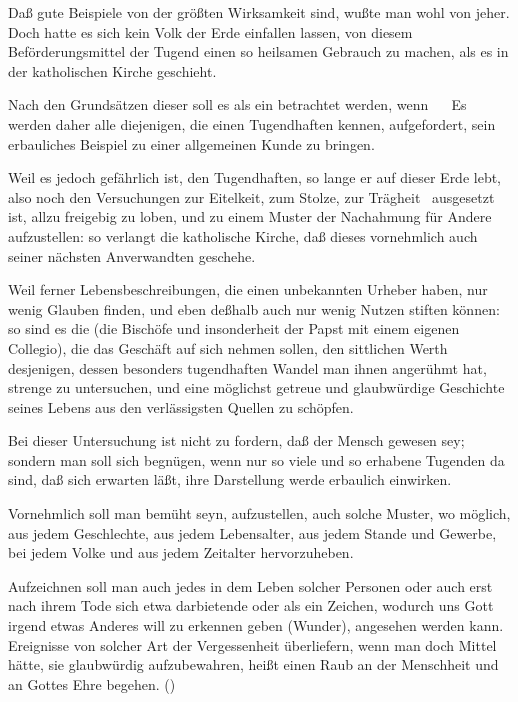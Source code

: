 Daß gute Beispiele von der größten Wirksamkeit sind, wußte man wohl von jeher. Doch hatte es sich kein Volk der Erde einfallen lassen, von diesem Beförderungsmittel der Tugend einen so heilsamen Gebrauch zu machen, als es in der katholischen Kirche geschieht.
\begin{aufza}
\item Nach den Grundsätzen dieser soll es als ein  betrachtet werden, wenn ~\  Es werden daher alle diejenigen, die einen Tugendhaften kennen, aufgefordert, sein erbauliches Beispiel zu einer allgemeinen Kunde zu bringen.
\item Weil es jedoch gefährlich ist, den Tugendhaften, so lange er auf dieser Erde lebt, also noch den Versuchungen zur Eitelkeit, zum Stolze, zur Trägheit \usw\ ausgesetzt ist, allzu freigebig zu loben, und zu einem Muster der Nachahmung für Andere aufzustellen: so verlangt die katholische Kirche, daß dieses vornehmlich  auch seiner nächsten Anverwandten geschehe.
\item Weil ferner Lebensbeschreibungen, die einen unbekannten Urheber haben, nur wenig Glauben finden, und eben deßhalb auch nur wenig Nutzen stiften können: so sind es die  (die Bischöfe und insonderheit der Papst mit einem eigenen Collegio), die das Geschäft auf sich nehmen sollen, den sittlichen Werth desjenigen, dessen besonders tugendhaften Wandel man ihnen angerühmt hat, strenge zu untersuchen, und eine möglichst getreue und glaubwürdige Geschichte seines Lebens aus den verlässigsten Quellen zu schöpfen.
\item Bei dieser Untersuchung ist nicht zu fordern, daß der Mensch  gewesen sey; sondern man soll sich begnügen, wenn nur so viele und so erhabene Tugenden da sind, daß sich erwarten läßt, ihre Darstellung werde erbaulich einwirken.
\item Vornehmlich soll man bemüht seyn,  aufzustellen, auch solche Muster, wo möglich, aus jedem Geschlechte, aus jedem Lebensalter, aus jedem Stande und Gewerbe, bei jedem Volke und aus jedem Zeitalter hervorzuheben.
\item Aufzeichnen soll man auch jedes in dem Leben solcher Personen oder auch erst nach ihrem Tode sich etwa darbietende  oder als ein Zeichen, wodurch uns Gott irgend etwas Anderes will zu erkennen geben (Wunder), angesehen werden kann. Ereignisse von solcher Art der Vergessenheit überliefern, wenn man doch Mittel hätte, sie glaubwürdig aufzubewahren, heißt einen Raub an der Menschheit und an Gottes Ehre begehen. ()

\end{aufza}
